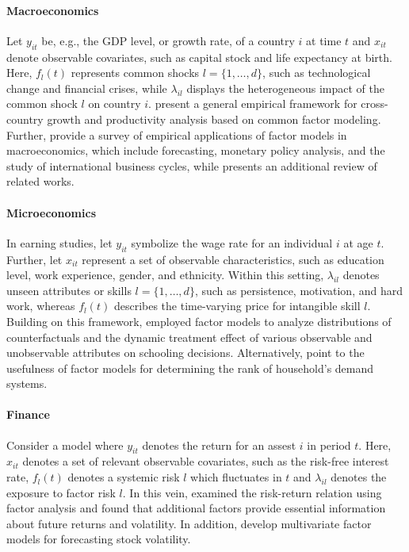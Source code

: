 \paragraph{Macroeconomics} Let $y_{it}$ be, e.g., the \ac{GDP} level, or growth rate, of a country $i$ at time $t$ and $x_{it}$ denote observable covariates, such as capital stock and life expectancy at birth. Here, $f_l(t)$ represents common shocks $l = \{1, \ldots, d\}$, such as technological change and financial crises, while $\lambda_{il}$ displays the heterogeneous impact of the common shock $l$ on country $i$.  \citet{eberhardt2011econometrics} present a general empirical framework for cross-country growth and productivity analysis based on common factor modeling. Further, \citet{breitung2006dynamic} provide a survey of empirical applications of factor models in macroeconomics, which include forecasting, monetary policy analysis, and the study of international business cycles, while \citet{reichlin2002factor} presents an additional review of related works. 

\paragraph{Microeconomics} In earning studies, let $y_{it}$ symbolize the wage rate for an individual $i$ at age $t$. Further, let $x_{it}$ represent a set of observable characteristics, such as education level, work experience, gender, and ethnicity. Within this setting, $\lambda_{il}$ denotes unseen attributes or skills $l = \{1, \ldots, d\}$, such as persistence, motivation, and hard work, whereas $f_l(t)$ describes the time-varying price for intangible skill $l$. Building on this framework, \citet{carneiro2003estimating} employed factor models to analyze distributions of counterfactuals and the dynamic treatment effect of various observable and unobservable attributes on schooling decisions. Alternatively, \citet{bai2002determining} point to the usefulness of factor models for determining the rank of household's demand systems. 

\paragraph{Finance} Consider a model where $y_{it}$ denotes the return for an assest $i$ in period $t$. Here, $x_{it}$ denotes a set of relevant observable covariates, such as the risk-free interest rate, $f_l(t)$ denotes a systemic risk $l$ which fluctuates in $t$ and $\lambda_{il}$ denotes the exposure to factor risk $l$. In this vein, \citet{ludvigson2007empirical} examined the risk-return relation using factor analysis and found that additional factors provide essential information about future returns and volatility. In addition, \citet{anderson2007forecasting} develop multivariate factor models for forecasting stock volatility.



